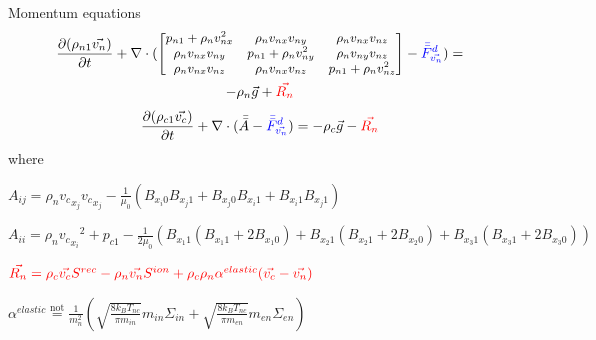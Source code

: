\documentclass{beamer}
\begin{document}
\begin{frame}{Momentum equations}
\begin{multline}
 \frac{\partial (\rho_{n1} \vec{v_n})  }{\partial t} + \nabla \cdot( 
\begin{small}
\begin{bmatrix}
p_{n1} + \rho_n v_{nx}^2 &  \rho_n v_{nx} v_{ny} &  \rho_n v_{nx} v_{nz}\\ 
\rho_n v_{nx} v_{ny} &  p_{n1} + \rho_n v_{ny}^2  &  \rho_n v_{ny} v_{nz}\\ 
\rho_n v_{nx} v_{nz}&   \rho_n v_{nx} v_{nz} &p_{n1} + \rho_n v_{nz}^2   
\end{bmatrix}
\end{small}
 - {\color{blue} \bar{\bar{F}}^d_{\vec{v_n}} } )= \\
-\rho_n \vec{g} + {\color{red}  \vec{R_n}  }  
\end{multline}
\[ \frac{\partial (\rho_{c1} \vec{v_c})  }{\partial t} + \nabla \cdot(\bar{\bar{A}}- {\color{blue} \bar{\bar{F}}^d_{\vec{v_n}} }  )=
-\rho_c \vec{g} - {\color{red}   \vec{R_n} }  \]
where

\begin{small}
$A_{ij} = \rho_n {v_c}_{x_j} {v_c}_{x_j} - \frac{1}{\mu_0}(B_{x_i 0}B_{x_j 1} + B_{x_j0}B_{x_i1}  + B_{x_i1}B_{x_j1}  ) $ 

$A_{ii} = \rho_n {{v_c}_{x_i}}^2 + p_{c1}  - \frac{1}{2 \mu_0}(B_{x_1 1} (B_{x_1 1} + 2  B_{x_1 0} )+ B_{x_2 1} (B_{x_2 1} + 2  B_{x_2 0} ) + B_{x_3 1} (B_{x_3 1} + 2  B_{x_3 0} ))$

\end{small}

${\color{red} \vec{R_n} = \rho_c \vec{v_c} S^{rec} - \rho_n \vec{v_n} S^{ion} +\rho_c \rho_n \alpha^{elastic} (\vec{v_c} - \vec{v_n}) } $

$\alpha^{elastic} \stackrel{\text{not}}{=}  \frac{1}{m_n^2}(\sqrt{\frac{8 k_B T_{nc}}{\pi m_{in}}} m_{in} \Sigma_{in} +  \sqrt{\frac{8 k_B T_{nc}}{\pi m_{en}}} m_{en} \Sigma_{en}) $ 
\end{frame}
\end{document}
